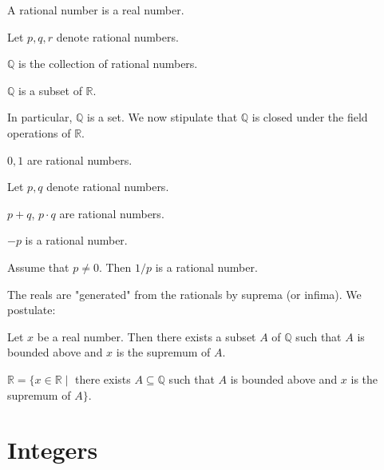 \documentclass{article}
\begin{document}
\begin{forthel}
\begin{signature}
A rational number is a real number.
\end{signature}

Let $p,q,r$ denote rational numbers.

\begin{definition}
$\mathbb{Q}$ is the collection of rational numbers.
\end{definition}

\begin{theorem}
$\mathbb{Q}$ is a subset of $\mathbb{R}$.
\end{theorem}
\end{forthel}
%
In particular, $\mathbb{Q}$ is a set.
We now stipulate that $\mathbb{Q}$ is closed under the
field operations of $\mathbb{R}$.
%
\begin{forthel}
\begin{axiom}
$0,1$ are rational numbers.
\end{axiom}

Let $p,q$ denote rational numbers.

\begin{axiom}
$p + q$, $p \cdot q$ are rational numbers.
\end{axiom}

\begin{axiom}
$-p$ is a rational number.
\end{axiom}

\begin{axiom}
Assume that $p \neq 0$. Then
$1/p$ is a rational number.
\end{axiom}
\end{forthel}
%
The reals are "generated" from
the rationals by suprema (or infima). We postulate:
%
\begin{forthel}

\begin{axiom} Let $x$ be a real number.
Then there exists a subset $A$ of $\mathbb{Q}$
such that $A$ is bounded above and
$x$ is the supremum of $A$.
\end{axiom}

\begin{theorem}
$\mathbb{R} = \{x \in \mathbb{R} \mid$ there exists $
A \subseteq \mathbb{Q}$ such that $
A$ is bounded above and $x$ is the supremum of $A\}$.
\end{theorem}
\end{forthel}


\section{Integers}
\end{document}

